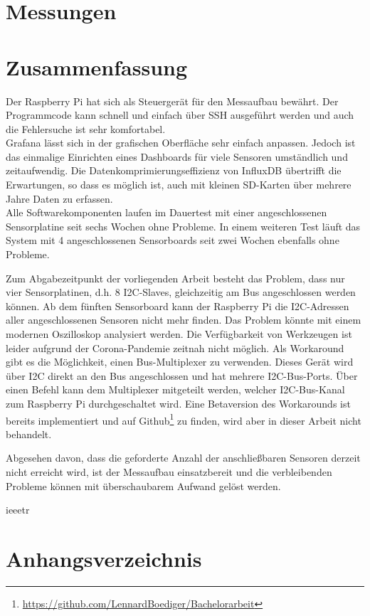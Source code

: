 \documentclass[a4paper,oneside,12pt,titlepage]{scrartcl}   %
\begin{document}
\section{Messungen}

\newpage
\section{Zusammenfassung}
Der Raspberry Pi hat sich als Steuergerät für den Messaufbau bewährt.
Der Programmcode kann schnell und einfach über SSH ausgeführt werden und auch die Fehlersuche ist sehr komfortabel.\\
Grafana lässt sich in der grafischen Oberfläche sehr einfach anpassen. Jedoch ist das einmalige Einrichten eines Dashboards für viele Sensoren umständlich und zeitaufwendig.
Die Datenkomprimierungseffizienz von InfluxDB übertrifft die Erwartungen, so dass es möglich ist, auch mit kleinen SD-Karten über mehrere Jahre Daten zu erfassen.\\
Alle Softwarekomponenten laufen im Dauertest mit einer angeschlossenen Sensorplatine seit sechs Wochen ohne Probleme.
In einem weiteren Test läuft das System mit 4 angeschlossenen Sensorboards seit zwei Wochen ebenfalls ohne Probleme.\smallskip

\noindent Zum Abgabezeitpunkt der vorliegenden Arbeit besteht das Problem, dass nur vier Sensorplatinen, d.h. 8 I2C-Slaves, gleichzeitig am Bus angeschlossen werden können.
Ab dem fünften Sensorboard kann der Raspberry Pi die I2C-Adressen aller angeschlossenen Sensoren nicht mehr finden.
Das Problem könnte mit einem modernen Oszilloskop analysiert werden. Die Verfügbarkeit von Werkzeugen ist leider aufgrund der Corona-Pandemie zeitnah nicht möglich.
Als Workaround gibt es die Möglichkeit, einen Bus-Multiplexer zu verwenden.
Dieses Gerät wird über I2C direkt an den Bus angeschlossen und hat mehrere I2C-Bus-Ports. Über einen Befehl kann dem Multiplexer mitgeteilt werden, welcher I2C-Bus-Kanal zum Raspberry Pi durchgeschaltet wird.
Eine Betaversion des Workarounds ist bereits implementiert und auf Github\footnote{\url{https://github.com/LennardBoediger/Bachelorarbeit}} zu finden, wird aber in dieser Arbeit nicht behandelt.
\smallskip

\noindent Abgesehen davon, dass die geforderte Anzahl der anschließbaren Sensoren derzeit nicht erreicht wird, ist der Messaufbau einsatzbereit und die verbleibenden Probleme können mit überschaubarem Aufwand gelöst werden.
\newpage

 {ieeetr}
\newpage
\section*{Anhangsverzeichnis}
\end{document}
